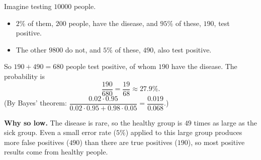 Imagine testing $10000$ people.
\begin{itemize}
\item $2\%$ of them, $200$ people, have the disease, and $95\%$ of these, $190$, test positive.
\item The other $9800$ do not, and $5\%$ of these, $490$, also test positive.
\end{itemize}
So $190+490=680$ people test positive, of whom $190$ have the disease. The probability is
\[\dfrac{190}{680}=\boxed{\dfrac{19}{68}}\approx27.9\%.\]
(By Bayes' theorem: $\dfrac{0.02\cdot0.95}{0.02\cdot0.95+0.98\cdot0.05}=\dfrac{0.019}{0.068}$.)

\textbf{Why so low.} The disease is rare, so the healthy group is $49$ times as large as the sick group. Even a small error rate ($5\%$) applied to this large group produces more false positives ($490$) than there are true positives ($190$), so most positive results come from healthy people.
